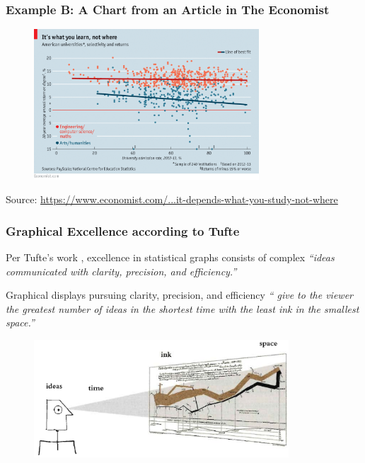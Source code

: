 \documentclass[notes, aspectratio=1610]{beamer}
\begin{document}
\begin{frame}
	\frametitle{Example B: A Chart from an Article in The Economist}
	\begin{figure}
		\begin{small}
			\begin{center}
				\includegraphics[width=0.75\textwidth]{images/economist_scatter.png}
			\end{center}
		\end{small}
	\end{figure}

	\footnotesize
	Source: \href{https://www.economist.com/united-states/2015/03/12/it-depends-what-you-study-not-where}
	{https://www.economist.com/...it-depends-what-you-study-not-where}
\end{frame}

\begin{frame}
	\frametitle{Graphical Excellence according to Tufte}
	Per Tufte's work \cite{tufte2001}, excellence in statistical graphs consists of complex 
	\emph{``ideas communicated with clarity, precision, and 
	efficiency.''}

	\vspace{1em}

	Graphical displays pursuing clarity, precision, and efficiency \emph{``
	give to the viewer the greatest number of ideas 
	in the shortest time with the least ink in the smallest space.''}

	\begin{figure}
		\begin{small}
			\begin{center}
				\includegraphics[width=0.85\textwidth]{
					images/graphical_excellence.png
					}
			\end{center}
			\caption{}
			\label{fig:}
		\end{small}
	\end{figure}
	
\end{frame}
\end{document}

